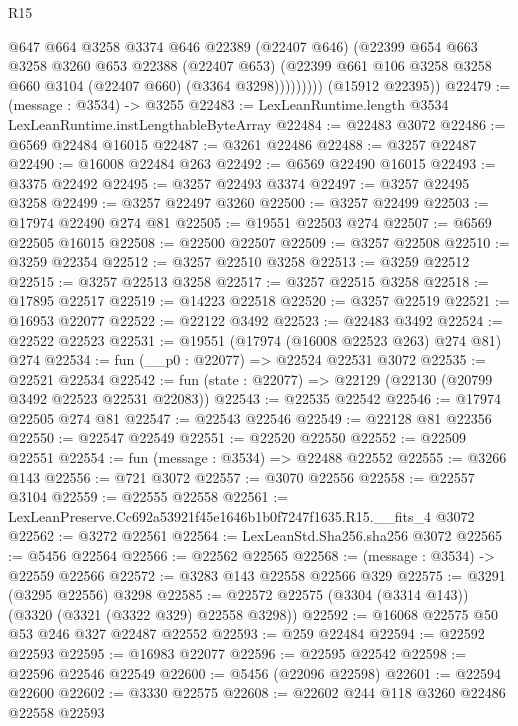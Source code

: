 \begin{lexlean}{R15}
\begin{coremodule}
                  @647
                  @664
                  @3258
                  @3374
                  @646
                  @22389
                  (@22407 @646)
                  (@22399
                    @654
                    @663
                    @3258
                    @3260
                    @653
                    @22388
                    (@22407 @653)
                    (@22399 @661 @106 @3258 @3258 @660 @3104 (@22407 @660) (@3364 @3298)))))))))
      (@15912 @22395))
@22479 := (message : @3534) -> @3255
@22483 := LexLeanRuntime.length @3534 LexLeanRuntime.instLengthableByteArray
@22484 := @22483 @3072
@22486 := @6569 @22484 @16015
@22487 := @3261 @22486
@22488 := @3257 @22487
@22490 := @16008 @22484 @263
@22492 := @6569 @22490 @16015
@22493 := @3375 @22492
@22495 := @3257 @22493 @3374
@22497 := @3257 @22495 @3258
@22499 := @3257 @22497 @3260
@22500 := @3257 @22499
@22503 := @17974 @22490 @274 @81
@22505 := @19551 @22503 @274
@22507 := @6569 @22505 @16015
@22508 := @22500 @22507
@22509 := @3257 @22508
@22510 := @3259 @22354
@22512 := @3257 @22510 @3258
@22513 := @3259 @22512
@22515 := @3257 @22513 @3258
@22517 := @3257 @22515 @3258
@22518 := @17895 @22517
@22519 := @14223 @22518
@22520 := @3257 @22519
@22521 := @16953 @22077
@22522 := @22122 @3492
@22523 := @22483 @3492
@22524 := @22522 @22523
@22531 := @19551 (@17974 (@16008 @22523 @263) @274 @81) @274
@22534 := fun (__p0 : @22077) => @22524 @22531 @3072
@22535 := @22521 @22534
@22542 := fun (state : @22077) => @22129 (@22130 (@20799 @3492 @22523 @22531 @22083))
@22543 := @22535 @22542
@22546 := @17974 @22505 @274 @81
@22547 := @22543 @22546
@22549 := @22128 @81 @22356
@22550 := @22547 @22549
@22551 := @22520 @22550
@22552 := @22509 @22551
@22554 := fun (message : @3534) => @22488 @22552
@22555 := @3266 @143
@22556 := @721 @3072
@22557 := @3070 @22556
@22558 := @22557 @3104
@22559 := @22555 @22558
@22561 := LexLeanPreserve.Cc692a53921f45e1646b1b0f7247f1635.R15.__fits_4 @3072
@22562 := @3272 @22561
@22564 := LexLeanStd.Sha256.sha256 @3072
@22565 := @5456 @22564
@22566 := @22562 @22565
@22568 := (message : @3534) -> @22559 @22566
@22572 := @3283 @143 @22558 @22566 @329
@22575 := @3291 (@3295 @22556) @3298
@22585 := @22572 @22575 (@3304 (@3314 @143)) (@3320 (@3321 (@3322 @329) @22558 @3298))
@22592 := @16068 @22575 @50 @53 @246 @327 @22487 @22552
@22593 := @259 @22484
@22594 := @22592 @22593
@22595 := @16983 @22077
@22596 := @22595 @22542
@22598 := @22596 @22546 @22549
@22600 := @5456 (@22096 @22598)
@22601 := @22594 @22600
@22602 := @3330 @22575
@22608 := @22602 @244 @118 @3260 @22486 @22558 @22593

\end{coremodule}
\end{lexlean}
